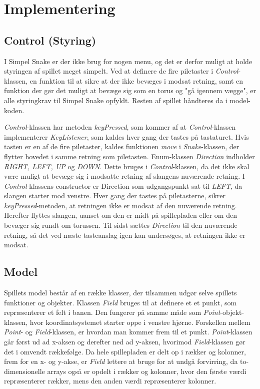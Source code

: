 \section{Implementering}
\subsection{Control (Styring)}
I Simpel Snake er der ikke brug for nogen menu, og det er derfor muligt at holde styringen af spillet meget simpelt. Ved at definere de fire piletaster i \textit{Control}-klassen, en funktion til at sikre at der ikke bevæges i modsat retning, samt en funktion der gør det muligt at bevæge sig som en torus og "gå igennem vægge", er alle styringkrav til Simpel Snake opfyldt. Resten af spillet håndteres da i model-koden.

\textit{Control}-klassen har metoden \textit{keyPressed}, som kommer af at \textit{Control}-klassen implementerer \textit{KeyListener}, som kaldes hver gang der tastes på tastaturet. Hvis tasten er en af de fire piletaster, kaldes funktionen \textit{move} i \textit{Snake}-klassen, der flytter hovedet i samme retning som piletasten.
Enum-klassen \textit{Direction} indholder \textit{RIGHT, LEFT, UP} og \textit{DOWN}. Dette bruges i \textit{Control}-klassen, da det ikke skal være muligt at bevæge sig i modsatte retning af slangens nuværende retning.
I \textit{Control}-klassens constructor er Direction som udgangspunkt sat til \textit{LEFT}, da slangen starter mod venstre. Hver gang der tastes på piletasterne, sikrer \textit{keyPressed}-metoden, at retningen ikke er modsat af den nuværende retning. Herefter flyttes slangen, uanset om den er midt på spillepladen eller om den bevæger sig rundt om torussen. Til sidst sættes \textit{Direction} til den nuværende retning, så det ved næste tasteanslag igen kan undersøges, at retningen ikke er modsat.


\subsection{Model}
Spillets model består af en række klasser, der tilsammen udgør selve spillets funktioner og objekter.
Klassen \textit{Field} bruges til at definere et et punkt, som repræsenterer et felt i banen. Den fungerer på samme måde som \textit{Point}-objekt-klassen, hvor koordinatsystemet starter oppe i venstre hjørne. Forskellen mellem \textit{Point}- og \textit{Field}-klassen, er hvordan man kommer frem til et punkt. \textit{Point}-klassen går først ud ad x-aksen og derefter ned ad y-aksen, hvorimod \textit{Field}-klassen gør det i omvendt rækkefølge. Da hele spillepladen er delt op i rækker og kolonner, frem for en x- og y-akse, er \textit{Field} lettere at bruge for at undgå forvirring, da to-dimensionelle arrays også er opdelt i rækker og kolonner, hvor den første værdi repræsenterer rækker, mens den anden værdi repræsenterer kolonner.

